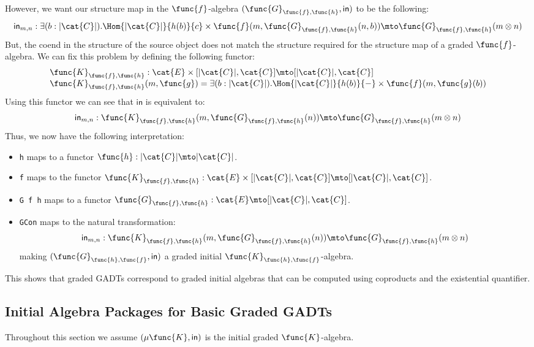 However, we want our structure map in the $\func{f}$-algebra
$(\func{G}_{\func{f},\func{h}},\mathsf{in})$ to be the following:
\[
    \mathsf{in}_{m,n} : 
    \exists(b : |\cat{C}|).\Hom{|\cat{C}|}{h(b)}{c} \times \func{f}(m,\func{G}_{\func{f},\func{h}}(n,b))
    \mto 
    \func{G}_{\func{f},\func{h}}(m \otimes n)
\]
But, the coend in the structure of the source object does not match
the structure required for the structure map of a graded
$\func{f}$-algebra.  We can fix this problem by defining the following
functor:
\[
    \begin{array}{lll}
        \func{K}_{\func{f},\func{h}} : \cat{E} \times [|\cat{C}|,\cat{C}] \mto [|\cat{C}|,\cat{C}]\\
        \func{K}_{\func{f},\func{h}}(m,\func{g}) = \exists(b : |\cat{C}|).\Hom{|\cat{C}|}{h(b)}{-} \times \func{f}(m,\func{g}(b))
    \end{array}
\]
Using this functor we can see that $\mathsf{in}$ is equivalent to:
\[
    \mathsf{in}_{m,n} : \func{K}_{\func{f},\func{h}}(m,\func{G}_{\func{f},\func{h}}(n)) \mto \func{G}_{\func{f},\func{h}}(m \otimes n)
\]
Thus, we now have the following interpretation:
\begin{itemize}
    \item \verb!h! maps to a functor 
    $\func{h} : |\cat{C}| \mto |\cat{C}|$. 

    \item \verb!f! maps to the functor 
    $\func{K}_{\func{f},\func{h}} : \cat{E} \times [|\cat{C}|,\cat{C}] \mto [|\cat{C}|, \cat{C}]$.    

    \item \verb!G f h! maps to a functor 
          $\func{G}_{\func{f},\func{h}} : \cat{E} \mto [|\cat{C}|,\cat{C}]$.

    \item \verb!GCon! maps to the natural transformation:
          \[
            \mathsf{in}_{m,n} : \func{K}_{\func{f},\func{h}}(m,\func{G}_{\func{f},\func{h}}(n)) \mto \func{G}_{\func{f},\func{h}}(m \otimes n)
          \]
          making $(\func{G}_{\func{h},\func{f}},\mathsf{in})$ a graded
          initial $\func{K}_{\func{h},\func{f}}$-algebra.
\end{itemize}
This shows that graded GADTs correspond to graded initial algebras
that can be computed using coproducts and the existential quantifier.

\subsection{Initial Algebra Packages for Basic Graded GADTs}
\label{subsec:initial_algebra_packages_for_basic_ggadts}
Throughout this section we assume $(\mu\func{K},\mathsf{in})$ is the
initial graded $\func{K}$-algebra.

